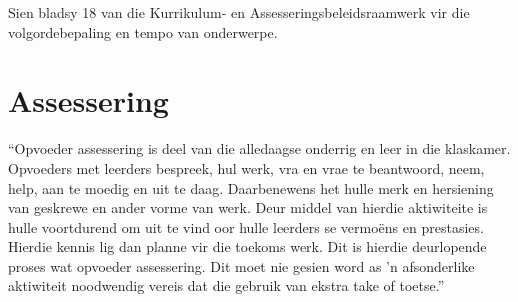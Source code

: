 Sien bladsy 18 van die Kurrikulum- en Assesseringsbeleidsraamwerk vir
die volgordebepaling en tempo van onderwerpe.


\section{Assessering}
``Opvoeder assessering is deel van die alledaagse onderrig en leer in die klaskamer. Opvoeders met leerders bespreek, hul werk, vra en vrae te beantwoord, neem, help, aan te moedig en uit te daag.
Daarbenewens het hulle merk en hersiening van geskrewe en ander vorme van werk. Deur middel van hierdie aktiwiteite is hulle voortdurend om uit te vind oor hulle leerders se vermo\"{e}ns en prestasies. Hierdie kennis lig dan planne vir die toekoms werk. Dit is hierdie deurlopende proses wat opvoeder assessering. Dit moet nie gesien word as 'n afsonderlike aktiwiteit noodwendig vereis dat die gebruik van ekstra take of toetse.''

